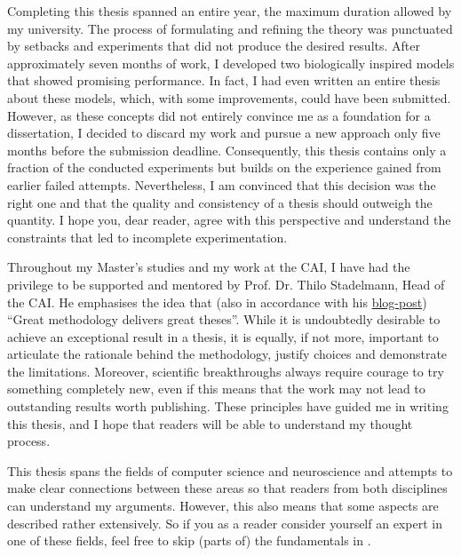 Completing this thesis spanned an entire year, the maximum duration allowed by my university.
The process of formulating and refining the theory was punctuated by setbacks and experiments that did not produce the desired results.
After approximately seven months of work, I developed two biologically inspired models that showed promising performance. 
In fact, I had even written an entire thesis about these models, which, with some improvements, could have been submitted.
However, as these concepts did not entirely convince me as a foundation for a dissertation, I decided to discard my work and pursue a new approach only five months before the submission deadline.
Consequently, this thesis contains only a fraction of the conducted experiments but builds on the experience gained from earlier failed attempts.
Nevertheless, I am convinced that this decision was the right one and that the quality and consistency of a thesis should outweigh the quantity.
I hope you, dear reader, agree with this perspective and understand the constraints that led to incomplete experimentation.

Throughout my Master's studies and my work at the CAI, I  have had the privilege to be supported and mentored by Prof. Dr. Thilo Stadelmann, Head of the CAI.
He emphasises the idea that (also in accordance with his \href{https://stdm.github.io/Great-methodology-delivers-great-theses/}{blog-post}) ``Great methodology delivers great theses''.
While it is undoubtedly desirable to achieve an exceptional result in a thesis, it is equally, if not more, important to articulate the rationale behind the methodology, justify choices and demonstrate the limitations. 
Moreover, scientific breakthroughs always require courage to try something completely new, even if this means that the work may not lead to outstanding results worth publishing.
These principles have guided me in writing this thesis, and I hope that readers will be able to understand my thought process.

This thesis spans the fields of computer science and neuroscience and attempts to make clear connections between these areas so that readers from both disciplines can understand my arguments. 
However, this also means that some aspects are described rather extensively.
So if you as a reader consider yourself an expert in one of these fields, feel free to skip (parts of) the fundamentals in .

